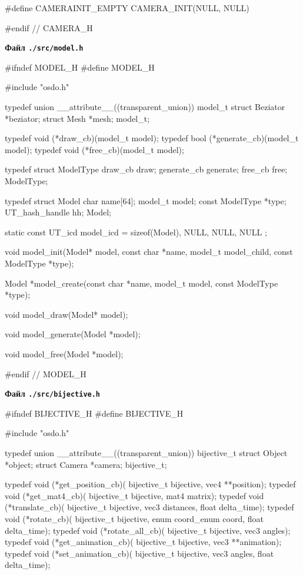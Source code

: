\documentclass[14pt,a4paper]{extarticle}
\theoremstyle{definition}
\renewcommand{\[}{\begin{singlespace}\begin{equation*}}
\renewcommand{\]}{\end{equation*}\end{singlespace}}
\begin{document}
\begin{multicols}{2}
\begin{ccode}
#define CAMERAINIT_EMPTY CAMERA_INIT(NULL, NULL)

#endif // CAMERA_H
\end{ccode}
\noindent\cprotect\textbf{Файл \verb+./src/model.h+}
\begin{ccode}
#ifndef MODEL_H
#define MODEL_H

#include "osdo.h"

typedef union __attribute__((transparent_union)) model_t {
   struct Beziator *beziator;
   struct Mesh *mesh;
} model_t;

typedef void (*draw_cb)(model_t model);
typedef bool (*generate_cb)(model_t model);
typedef void (*free_cb)(model_t model);

typedef struct ModelType {
    draw_cb draw;
    generate_cb generate;
    free_cb free;
} ModelType;

typedef struct Model {
    char name[64];
    model_t model;
    const ModelType *type;
    UT_hash_handle hh;
} Model;

static const UT_icd model_icd = {
    sizeof(Model), NULL, NULL, NULL
};

void model_init(Model* model, const char *name,
                model_t model_child, const ModelType *type);

Model *model_create(const char *name, model_t model,
                    const ModelType *type);

void model_draw(Model* model);

void model_generate(Model *model);

void model_free(Model *model);

#endif // MODEL_H
\end{ccode}
\noindent\cprotect\textbf{Файл \verb+./src/bijective.h+}
\begin{ccode}
#ifndef BIJECTIVE_H
#define BIJECTIVE_H

#include "osdo.h"

typedef union __attribute__((transparent_union)) bijective_t {
   struct Object *object;
   struct Camera *camera;
} bijective_t;

typedef void (*get_position_cb)(
        bijective_t bijective, vec4 **position);
typedef void (*get_mat4_cb)(
        bijective_t bijective, mat4 matrix);
typedef void (*translate_cb)(
        bijective_t bijective, vec3 distances, float delta_time);
typedef void (*rotate_cb)(
        bijective_t bijective, enum coord_enum coord, float delta_time);
typedef void (*rotate_all_cb)(
        bijective_t bijective, vec3 angles);
typedef void (*get_animation_cb)(
        bijective_t bijective, vec3 **animation);
typedef void (*set_animation_cb)(
        bijective_t bijective, vec3 angles, float delta_time);


\end{ccode}
\end{multicols}
\end{document}
